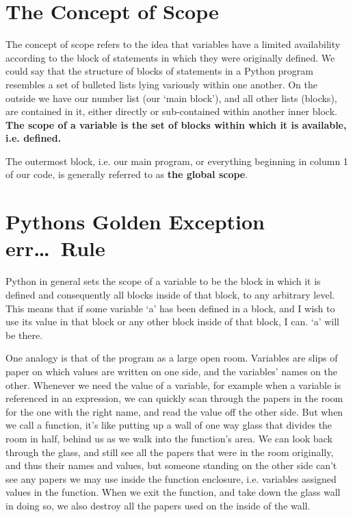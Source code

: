 \section{The Concept of Scope}

The concept of scope refers to the idea that variables have a   limited availability according to the block of statements in which they   were originally defined. We could say that the structure of blocks of   statements in a Python program resembles a set of bulleted lists lying   variously within one another. On the outside we have our number list   (our `main block'), and all other lists (blocks), are contained   in it, either directly or sub-contained within another inner   block. \textbf{The scope of a variable is the set of blocks within which    it is available, i.e. defined.}

The outermost block, i.e. our main program, or everything beginning   in column 1 of our code, is generally referred to as \textbf{the global   scope}.

\section{Pythons Golden Exception err\ldots\ Rule}

Python in general sets the scope of a variable to be the block in   which it is defined and consequently all blocks inside of that block,   to any arbitrary level.  This means that if some variable `a' has been   defined in a block, and I wish to use its value in that block or any   other block inside of that block, I can. `a' will be there.

One analogy is that of the program as a large open room. Variables   are slips of paper on which values are written on one side, and the   variables' names on the other. Whenever we need the value of a   variable, for example when a variable is referenced in an expression,   we can quickly scan through the papers in the room for the one with the   right name, and read the value off the other side. But when we call a   function, it's like putting up a wall of one way glass that divides the   room in half, behind us as we walk into the function's area. We can   look back through the glass, and still see all the papers that were in   the room originally, and thus their names and values, but someone   standing on the other side can't see any papers we may use inside the   function enclosure, i.e. variables assigned values in the function.   When we exit the function, and take down the glass wall in doing so, we   also destroy all the papers used on the inside of the wall.

